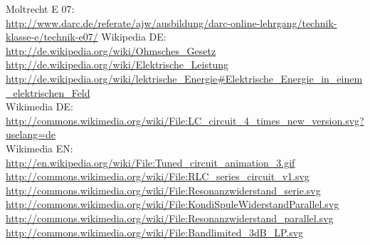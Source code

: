 \begin{thebibliography}{}
       Moltrecht E 07: \\
                    \url{http://www.darc.de/referate/ajw/ausbildung/darc-online-lehrgang/technik-klasse-e/technik-e07/}
        Wikipedia DE: \\
                    \url{http://de.wikipedia.org/wiki/Ohmsches_Gesetz}\\ 
                    \url{http://de.wikipedia.org/wiki/Elektrische_Leistung}\\ 
                    \url{http://de.wikipedia.org/wiki/lektrische_Energie#Elektrische_Energie_in_einem_elektrischen_Feld}\\ 
    	Wikimedia DE:\\
    				\url{http://commons.wikimedia.org/wiki/File:LC_circuit_4_times_new_version.svg?uselang=de}\\
   		Wikimedia EN:\\
   					\url{http://en.wikipedia.org/wiki/File:Tuned_circuit_animation_3.gif}\\
   					\url{http://commons.wikimedia.org/wiki/File:RLC_series_circuit_v1.svg}\\
   					\url{http://commons.wikimedia.org/wiki/File:Resonanzwiderstand_serie.svg}\\
   					\url{http://commons.wikimedia.org/wiki/File:KondiSpuleWiderstandParallel.svg}\\
   					\url{http://commons.wikimedia.org/wiki/File:Resonanzwiderstand_parallel.svg}\\
   					\url{http://commons.wikimedia.org/wiki/File:Bandlimited_3dB_LP.svg}\\
   					
\end{thebibliography} 


